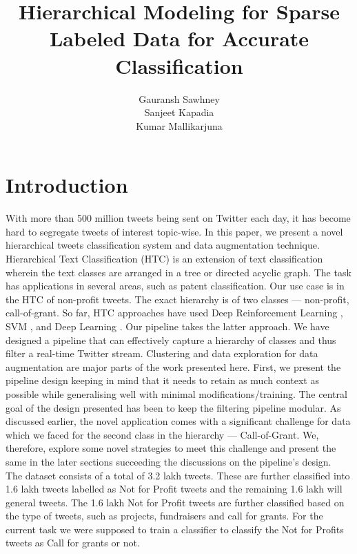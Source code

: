 \documentclass[11pt,a4paper]{article}
\title{Hierarchical Modeling for Sparse Labeled Data for Accurate Classification}
\author{Gauransh Sawhney \\\And
  Sanjeet Kapadia \\\And Kumar Mallikarjuna\\}
\date{}
\begin{document}
\maketitle

\section{Introduction}

With more than 500 million tweets being sent on Twitter each day, it has become hard to segregate tweets of interest topic-wise. In this paper, we present a novel hierarchical tweets classification system and data augmentation technique. Hierarchical Text Classification (HTC) is an extension of text classification wherein the text classes are arranged in a tree or directed acyclic graph. The task has applications in several areas, such as patent classification. Our use case is in the HTC of non-profit tweets. The exact hierarchy is of two classes --- non-profit, call-of-grant. So far, HTC approaches have used Deep Reinforcement Learning \cite{Mao_2019}, SVM \cite{Gopal}, and Deep Learning \cite{pmlr-v80-wehrmann18a, zhang2021lahcn}. Our pipeline takes the latter approach.
We have designed a pipeline that can effectively capture a hierarchy of classes and thus filter a real-time Twitter stream. Clustering and data exploration for data augmentation are major parts of the work presented here. First, we present the pipeline design keeping in mind that it needs to retain as much context as possible while generalising well with minimal modifications/training. The central goal of the design presented has been to keep the filtering pipeline modular.
As discussed earlier, the novel application comes with a significant challenge for data which we faced for the second class in the hierarchy --- Call-of-Grant. We, therefore, explore some novel strategies to meet this challenge and present the same in the later sections succeeding the discussions on the pipeline's design.\\
The dataset consists of a total of 3.2 lakh tweets. These are further classified into 1.6 lakh tweets labelled as Not for Profit tweets and the remaining 1.6 lakh will general tweets. The 1.6 lakh Not for Profit tweets are further classified based on the type of tweets, such as projects, fundraisers and call for grants. For the current task we were supposed to train a classifier to classify the Not for Profits tweets as Call for grants or not.

\end{document}
